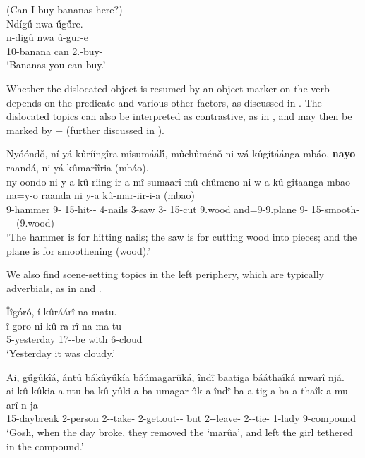 \documentclass[output=paper]{langscibook}
\begin{document}
\z

\ea
\label{bkm:Ref115858203}
(Can I buy bananas here?)\\
 Ndíg\'{û} nwa \'{û}g\'{û}re.\\
\gll
n-digû  nwa  û-gur-e\\
10-banana  can 2\SG.\SM{}-buy-\SBJV{}\\
\glt
‘Bananas you can buy.’

\z

Whether the dislocated object is resumed by an object marker on the verb depends on the predicate and various other factors, as discussed in . The dislocated topics can also be interpreted as contrastive, as in , and may then be marked by \NA+\PRO{} (further discussed in ).

\ea
\label{bkm:Ref120101100}
{Nyóóndǒ, ní yá kûrííng\'{î}ra mîsumáál\'{î}, mûchûménǒ ni wá kûgítáánga mbáo,}{ \textbf{nayo} raandá, ni yá kûmarîîria (mbáo).}\\
\gll
ny-oondo  ni  y-a  kû-riing-ir-a  mî-sumaarî mû-chûmeno  ni  w-a  kû-gitaanga  mbao na=y-o raanda  ni  y-a  kû-mar-iir-i-a  (mbao)\\
9-hammer \COP{} 9-\CONN{} 15-hit-\APPL{}-\FV{} 4-nails 3-saw \COP{} 3-\CONN{} 15-cut 9.wood and=9-\PRO 9.plane \COP{} 9-\CONN{} 15-smooth-\APPL-\IC-\FV{} (9.wood)\\
\glt
‘The hammer is for hitting nails; the saw is for cutting wood into pieces; and the plane is for smoothening (wood).’

\z

We also find scene-setting topics in the left periphery, which are typically adverbials, as in  and .

\ea
\label{bkm:Ref131607959}
Îîgóró, í kûráárî na matu.\\
\gll
î-goro  ni  kû-ra-rî  na   ma-tu\\
5-yesterday \FOC{} 17\SM-\YPST{}-be  with  6-cloud\\
\glt
‘Yesterday it was cloudy.’

\z

\ea
\label{bkm:Ref131607960}
Ai, g\'{û}gûk\'{î}á, ántû bákûy\'{û}kía báúmagarûká, \'{î}ndî baatiga bááthaîká mwarî njá. \\
\gll
ai kû-kûkia   a-ntu   ba-kû-yûki-a ba-umagar-ûk-a   îndî   ba-a-tig-a   ba-a-thaîk-a   mu-arî  n-ja \\
\EXCL{} 15-daybreak   2-person 2\SM{}-\PRS{}-take-\FV{} 2\SM{}-get.out-\RECP-\FV{} but 2\SM-\PST{}-leave-\FV{} 2\SM-\PST{}-tie-\FV{}   1-lady  9-compound\\
\glt
‘Gosh, when the day broke, they removed the ‘marûa’, and left the girl tethered in the compound.’
\end{document}
